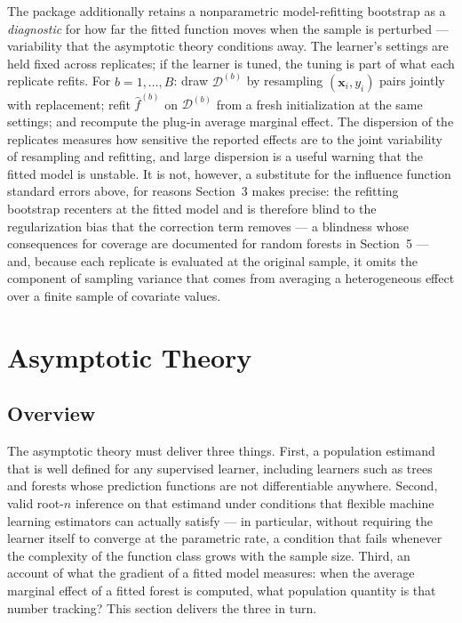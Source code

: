 \documentclass[12pt]{article}
\begin{document}
	The package additionally retains a nonparametric model-refitting bootstrap
	\citep{efron1979, efrontibshirani1993} as a \emph{diagnostic} for how far the fitted function moves when the sample is perturbed --- variability that the asymptotic theory conditions away. The learner's settings are held fixed across replicates; if the learner is tuned, the tuning is part of what each replicate refits. For $b = 1, \dots, B$: draw
	$\mathcal{D}^{(b)}$ by resampling $(\mathbf{x}_i, y_i)$ pairs jointly with
	replacement; refit $\hat{f}^{(b)}$ on $\mathcal{D}^{(b)}$ from a fresh initialization at the same settings; and recompute the plug-in average
	marginal effect. The dispersion of the replicates measures how sensitive the reported effects are to the joint variability of resampling and refitting, and large dispersion is a useful warning that the
	fitted model is unstable. It is not, however, a substitute for the influence
	function standard errors above, for reasons Section~3 makes precise: the
	refitting bootstrap recenters at the fitted model and is therefore blind to the
	regularization bias that the correction term removes --- a blindness whose
	consequences for coverage are documented for random forests in Section~5 --- and,
	because each replicate is evaluated at the original sample, it omits the
	component of sampling variance that comes from averaging a heterogeneous effect
	over a finite sample of covariate values.
	
	\section{Asymptotic Theory}
	\label{sec:theory}
	
	\subsection{Overview}
	
	The asymptotic theory must deliver three things. First, a population estimand that
	is well defined for any supervised learner, including learners such as trees and
	forests whose prediction functions are not differentiable anywhere. Second, valid
	root-$n$ inference on that estimand under conditions that flexible machine learning
	estimators can actually satisfy --- in particular, without requiring the learner
	itself to converge at the parametric rate, a condition that fails whenever the
	complexity of the function class grows with the sample size. Third, an account of
	what the gradient of a fitted model measures: when the average marginal effect of a
	fitted forest is computed, what population quantity is that number tracking? This
	section delivers the three in turn.
	
\end{document}
